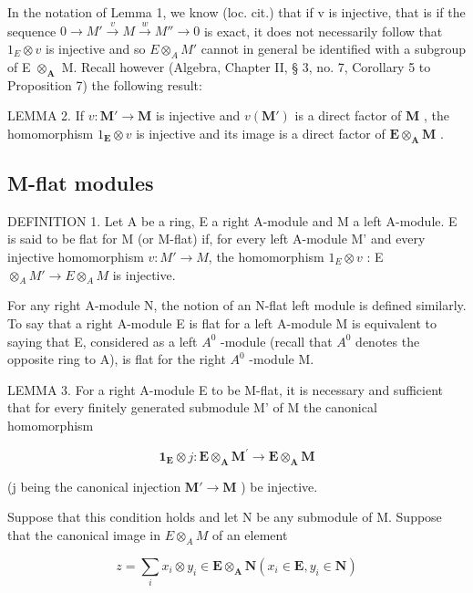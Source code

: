 In the notation of Lemma 1, we know (loc. cit.) that if v is injective, that is if the sequence \(0 \rightarrow M' \stackrel{v}{\rightarrow} M \stackrel{w}{\rightarrow} M'' \rightarrow 0\) is exact, it does not necessarily follow that \(1_{E} \otimes v\) is injective and so \(E \otimes_{A} M'\) cannot in general be identified with a subgroup of E \(\otimes_{\mathbf{A}}\) M. Recall however (Algebra, Chapter II, § 3, no. 7, Corollary 5 to Proposition 7) the following result:

LEMMA 2. If \(v: \mathbf{M}' \to \mathbf{M}\) is injective and \(v(\mathbf{M}')\) is a direct factor of \(\mathbf{M}\) , the homomorphism \(1_{\mathbf{E}} \otimes v\) is injective and its image is a direct factor of \(\mathbf{E} \otimes_{\mathbf{A}} \mathbf{M}\) .

\subsection{M-flat modules}

DEFINITION 1. Let A be a ring, E a right A-module and M a left A-module. E is said to be flat for M (or M-flat) if, for every left A-module M' and every injective homomorphism \(v: M' \to M\), the homomorphism \(1_{E} \otimes v\) : E \(\otimes_{A} M' \to E \otimes_{A} M\) is injective.

For any right A-module N, the notion of an N-flat left module is defined similarly. To say that a right A-module E is flat for a left A-module M is equivalent to saying that E, considered as a left \(A^{0}\) -module (recall that \(A^{0}\) denotes the opposite ring to A), is flat for the right \(A^{0}\) -module M.

LEMMA 3. For a right A-module E to be M-flat, it is necessary and sufficient that for every finitely generated submodule M' of M the canonical homomorphism

\[
\mathbf {1} _ {\mathbf {E}} \otimes j: \mathbf {E} \otimes_ {\mathbf {A}} \mathbf {M} ^ {\prime} \rightarrow \mathbf {E} \otimes_ {\mathbf {A}} \mathbf {M}
\]

(j being the canonical injection \(\mathbf{M}'\to \mathbf{M}\) ) be injective.

Suppose that this condition holds and let N be any submodule of M. Suppose that the canonical image in \(E \otimes_{A} M\) of an element

\[
z = \sum_ {i} x _ {i} \otimes y _ {i} \in \mathbf {E} \otimes_ {\mathbf {A}} \mathbf {N} (x _ {i} \in \mathbf {E}, y _ {i} \in \mathbf {N})
\]

